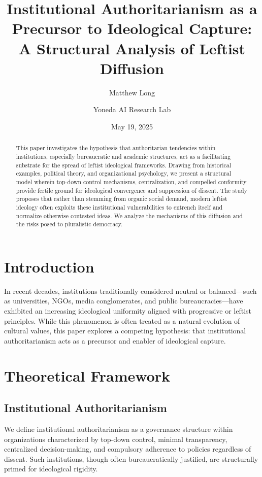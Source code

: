 \documentclass[11pt]{article}
\title{\textbf{Institutional Authoritarianism as a Precursor to Ideological Capture: A Structural Analysis of Leftist Diffusion}}
\author[1]{Matthew Long}
\author[1]{Yoneda AI Research Lab}
\affil[1]{\texttt{matt@yoneda.ai}}
\date{May 19, 2025}
\begin{document}
\maketitle
\doublespacing

\begin{abstract}
This paper investigates the hypothesis that authoritarian tendencies within institutions, especially bureaucratic and academic structures, act as a facilitating substrate for the spread of leftist ideological frameworks. Drawing from historical examples, political theory, and organizational psychology, we present a structural model wherein top-down control mechanisms, centralization, and compelled conformity provide fertile ground for ideological convergence and suppression of dissent. The study proposes that rather than stemming from organic social demand, modern leftist ideology often exploits these institutional vulnerabilities to entrench itself and normalize otherwise contested ideas. We analyze the mechanisms of this diffusion and the risks posed to pluralistic democracy.
\end{abstract}

\section{Introduction}

In recent decades, institutions traditionally considered neutral or balanced—such as universities, NGOs, media conglomerates, and public bureaucracies—have exhibited an increasing ideological uniformity aligned with progressive or leftist principles. While this phenomenon is often treated as a natural evolution of cultural values, this paper explores a competing hypothesis: that institutional authoritarianism acts as a precursor and enabler of ideological capture.

\section{Theoretical Framework}

\subsection{Institutional Authoritarianism}

We define institutional authoritarianism as a governance structure within organizations characterized by top-down control, minimal transparency, centralized decision-making, and compulsory adherence to policies regardless of dissent. Such institutions, though often bureaucratically justified, are structurally primed for ideological rigidity.
\end{document}
